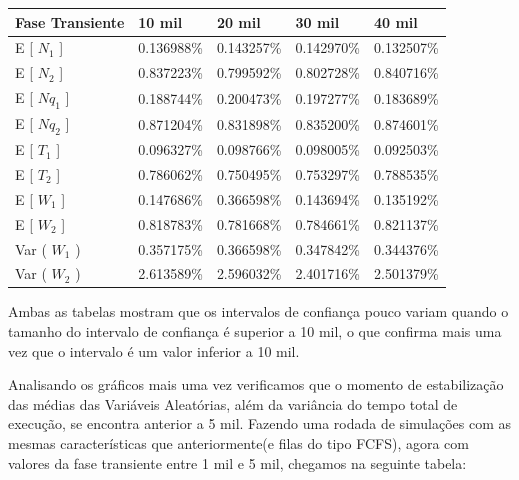 \documentclass[a4paper,10pt]{article}
\begin{document}
\begin{center}
\begin{tabular} { | l | l | l | l | l | }
    \hline
    Fase Transiente & 10 mil     & 20 mil     & 30 mil     & 40 mil \\ \hline
    E [ $N_1$ ]     & 0.136988\% & 0.143257\% & 0.142970\% & 0.132507\% \\ \hline
    E [ $N_2$ ]     & 0.837223\% & 0.799592\% & 0.802728\% & 0.840716\% \\ \hline
    E [ $Nq_1$ ]    & 0.188744\% & 0.200473\% & 0.197277\% & 0.183689\% \\ \hline
    E [ $Nq_2$ ]    & 0.871204\% & 0.831898\% & 0.835200\% & 0.874601\% \\ \hline
    E [ $T_1$ ]     & 0.096327\% & 0.098766\% & 0.098005\% & 0.092503\% \\ \hline
    E [ $T_2$ ]     & 0.786062\% & 0.750495\% & 0.753297\% & 0.788535\% \\ \hline
    E [ $W_1$ ]     & 0.147686\% & 0.366598\% & 0.143694\% & 0.135192\% \\ \hline
    E [ $W_2$ ]     & 0.818783\% & 0.781668\% & 0.784661\% & 0.821137\% \\ \hline
    Var ( $W_1$ )   & 0.357175\% & 0.366598\% & 0.347842\% & 0.344376\% \\ \hline
    Var ( $W_2$ )   & 2.613589\% & 2.596032\% & 2.401716\% & 2.501379\% \\ \hline
\end{tabular}
\end{center}

    Ambas as tabelas mostram que os intervalos de confiança pouco variam quando o tamanho do intervalo de confiança é superior a 10 mil, o que confirma mais
uma vez que o intervalo é um valor inferior a 10 mil.

    Analisando os gráficos mais uma vez verificamos que o momento de estabilização das médias das Variáveis Aleatórias, além da variância do tempo total de
execução, se encontra anterior a 5 mil. Fazendo uma rodada de simulações com as mesmas características que anteriormente(e filas do tipo FCFS), agora com
valores da fase transiente entre 1 mil e 5 mil, chegamos na seguinte tabela:
\end{document}
